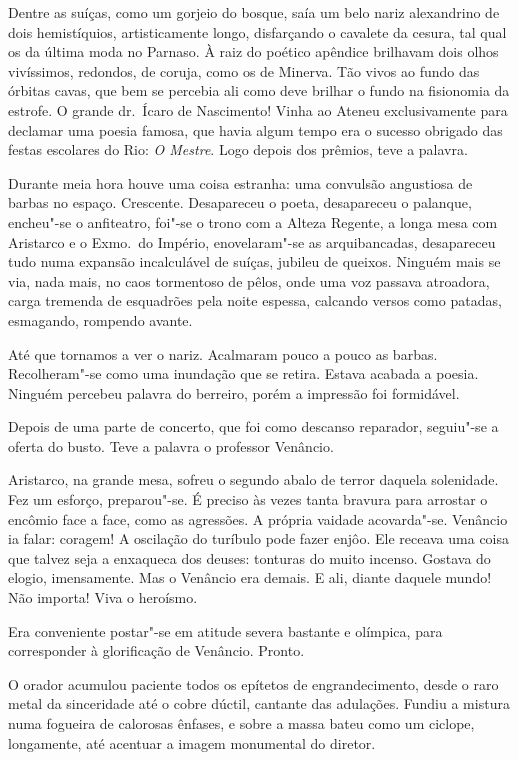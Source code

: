 Dentre as suíças, como um gorjeio do bosque, saía um belo nariz
alexandrino de dois hemistíquios, artisticamente longo, disfarçando o
cavalete da cesura, tal qual os da última moda no Parnaso. À raiz do
poético apêndice brilhavam dois olhos vivíssimos, redondos, de coruja,
como os de Minerva. Tão vivos ao fundo das órbitas cavas, que bem se
percebia ali como deve brilhar o fundo na fisionomia da estrofe. O
grande dr.~Ícaro de Nascimento! Vinha ao Ateneu exclusivamente para
declamar uma poesia famosa, que havia algum tempo era o sucesso
obrigado das festas escolares do Rio: \textit{O Mestre}. Logo depois dos
prêmios, teve a palavra.

Durante meia hora houve uma coisa estranha: uma convulsão angustiosa de
barbas no espaço. Crescente. Desapareceu o poeta, desapareceu o
palanque, encheu"-se o anfiteatro, foi"-se o trono com a Alteza
Regente, a longa mesa com Aristarco e o Exmo.~do Império,
enovelaram"-se as arquibancadas, desapareceu tudo numa expansão
incalculável de suíças, jubileu de queixos. Ninguém mais se via, nada
mais, no caos tormentoso de pêlos, onde uma voz passava atroadora,
carga tremenda de esquadrões pela noite espessa, calcando versos como
patadas, esmagando, rompendo avante. 


Até que tornamos a ver o nariz.
Acalmaram pouco a pouco as barbas. Recolheram"-se como uma inundação
que se retira. Estava acabada a poesia. Ninguém percebeu palavra do
berreiro, porém a impressão foi formidável. 

Depois de uma parte de
concerto, que foi como descanso reparador, seguiu"-se a oferta do
busto. Teve a palavra o professor Venâncio. 

Aristarco, na grande mesa,
sofreu o segundo abalo de terror daquela solenidade. Fez um esforço,
preparou"-se. É preciso às vezes tanta bravura para arrostar o encômio
face a face, como as agressões. A própria vaidade acovarda"-se.
Venâncio ia falar: coragem! A oscilação do turíbulo pode fazer enjôo.
Ele receava uma coisa que talvez seja a enxaqueca dos deuses: tonturas
do muito incenso. Gostava do elogio, imensamente. Mas o Venâncio era
demais. E ali, diante daquele mundo! Não importa! Viva o heroísmo. 

Era conveniente postar"-se em atitude severa bastante e olímpica, para
corresponder à glorificação de Venâncio. Pronto. 

O orador acumulou
paciente todos os epítetos de engrandecimento, desde o raro metal da
sinceridade até o cobre dúctil, cantante das adulações. Fundiu a
mistura numa fogueira de calorosas ênfases, e sobre a massa bateu como
um ciclope, longamente, até acentuar a imagem monumental do diretor.

